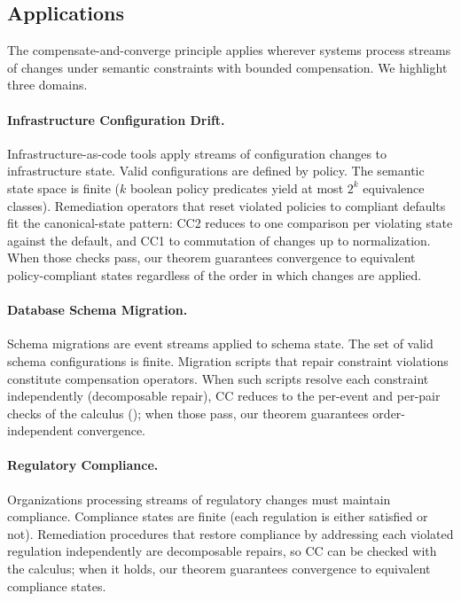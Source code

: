 \documentclass[11pt,a4paper]{article}
\theoremstyle{plain}
\theoremstyle{definition}
\theoremstyle{remark}
\renewcommand{\_}{\textunderscore\allowbreak}
\begin{document}
\subsection{Applications}

The compensate-and-converge principle applies wherever systems process streams
of changes under semantic constraints with bounded compensation.  We highlight
three domains.

\paragraph{Infrastructure Configuration Drift.}
Infrastructure-as-code tools apply streams of configuration changes to
infrastructure state.  Valid configurations are defined by policy.  The
semantic state space is finite ($k$ boolean policy predicates yield at most
$2^k$ equivalence classes).  Remediation operators that reset violated policies
to compliant defaults fit the canonical-state pattern: CC2 reduces to one
comparison per violating state against the default, and CC1 to commutation of
changes up to normalization.  When those checks pass, our theorem guarantees
convergence to equivalent policy-compliant states regardless of the order in
which changes are applied.

\paragraph{Database Schema Migration.}
Schema migrations are event streams applied to schema state.  The set of valid
schema configurations is finite.  Migration scripts that repair constraint
violations constitute compensation operators.  When such scripts resolve each
constraint independently (decomposable repair), CC reduces to the per-event
and per-pair checks of the calculus (); when those pass,
our theorem guarantees order-independent convergence.

\paragraph{Regulatory Compliance.}
Organizations processing streams of regulatory changes must maintain
compliance.  Compliance states are finite (each regulation is either satisfied
or not).  Remediation procedures that restore compliance by addressing each
violated regulation independently are decomposable repairs, so CC can be
checked with the calculus; when it holds, our theorem guarantees convergence
to equivalent compliance states.
\end{document}

